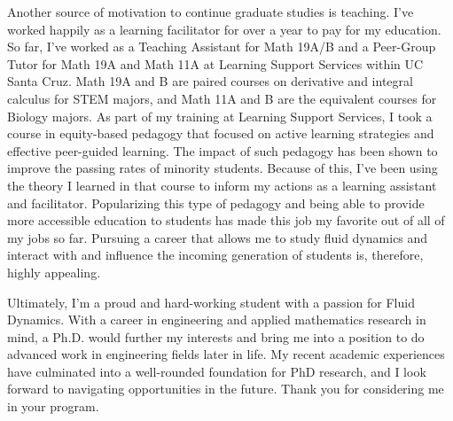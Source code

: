 \documentclass{article}
\begin{document}
Another source of motivation to continue graduate studies is teaching. I've worked happily as a learning facilitator for over a year to pay for my education. So far, I've worked as a Teaching Assistant for Math 19A/B and a Peer-Group Tutor for Math 19A and Math 11A at Learning Support Services within UC Santa Cruz. Math 19A and B are paired courses on derivative and integral calculus for STEM majors, and Math 11A and B are the equivalent courses for Biology majors. As part of my training at Learning Support Services, I took a course in equity-based pedagogy that focused on active learning strategies and effective peer-guided learning. The impact of such pedagogy has been shown to improve the passing rates of minority students. Because of this, I've been using the theory I learned in that course to inform my actions as a learning assistant and facilitator. Popularizing this type of pedagogy and being able to provide more accessible education to students has made this job my favorite out of all of my jobs so far. Pursuing a career that allows me to study fluid dynamics and interact with and influence the incoming generation of students is, therefore, highly appealing.

Ultimately, I'm a proud and hard-working student with a passion for Fluid Dynamics. With a career in engineering and applied mathematics research in mind, a Ph.D. would further my interests and bring me into a position to do advanced work in engineering fields later in life. My recent academic experiences have culminated into a well-rounded foundation for PhD research, and I look forward to navigating opportunities in the future. Thank you for considering me in your program. 
\end{document}
